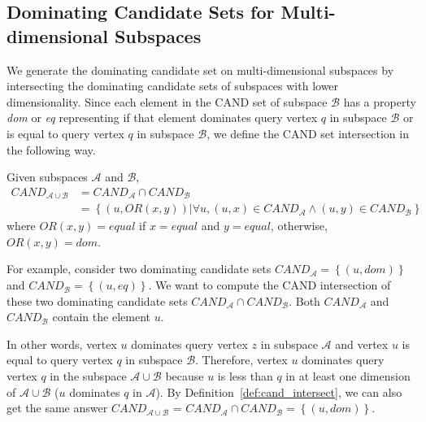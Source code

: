 \subsection{Dominating Candidate Sets for Multi-dimensional Subspaces}

We generate the dominating candidate set on multi-dimensional subspaces by intersecting the dominating candidate sets of subspaces with lower dimensionality. Since each element in the CAND set of subspace $\mathcal{B}$ has a property \emph{dom} or \emph{eq} representing if that element dominates query vertex $q$ in subspace $\mathcal{B}$ or is equal to query vertex $q$ in subspace $\mathcal{B}$, we define the CAND set intersection in the following way.

\begin{definition}
\label{def:cand_intersect}
Given subspaces $\mathcal{A}$ and $\mathcal{B}$,
\begin{equation}
\begin{split}
\mathit{CAND}_{\mathcal{A} \cup \mathcal{B}} &= \mathit{CAND}_\mathcal{A} \cap \mathit{CAND}_\mathcal{B}\\
           &= \left\{(u, OR(x, y)) |\forall u, (u, x)\in \mathit{CAND}_\mathcal{A} \wedge (u, y)\in \mathit{CAND}_\mathcal{B} \right\}
\end{split}
\end{equation}
where $OR(x, y) = equal$ if $x = equal$ and $y = equal$, otherwise, $OR(x, y) = dom$.
\end{definition}

For example, consider two dominating candidate sets $\mathit{CAND}_\mathcal{A} = \left\{(u, dom)\right\}$ and $\mathit{CAND}_\mathcal{B} = \left\{(u, eq)\right\}$. We want to compute the CAND intersection of these two dominating candidate sets $\mathit{CAND}_\mathcal{A} \cap \mathit{CAND}_\mathcal{B}$. 
Both $\mathit{CAND}_\mathcal{A}$ and $\mathit{CAND}_\mathcal{B}$ contain the element $u$. 

In other words, vertex $u$ dominates query vertex $z$ in subspace $\mathcal{A}$ and vertex $u$ is equal to query vertex $q$ in subspace $\mathcal{B}$. 
Therefore, vertex $u$ dominates query vertex $q$ in the subspace $\mathcal{A} \cup \mathcal{B}$ because $u$ is less than $q$ in at least one dimension of $\mathcal{A} \cup \mathcal{B}$ ($u$ dominates $q$ in $\mathcal{A}$). By Definition~\ref{def:cand_intersect}, we can also get the same answer $\mathit{CAND}_{\mathcal{A} \cup \mathcal{B}}$ = $\mathit{CAND}_\mathcal{A} \cap \mathit{CAND}_\mathcal{B} = \left\{(u, dom)\right\}$.



